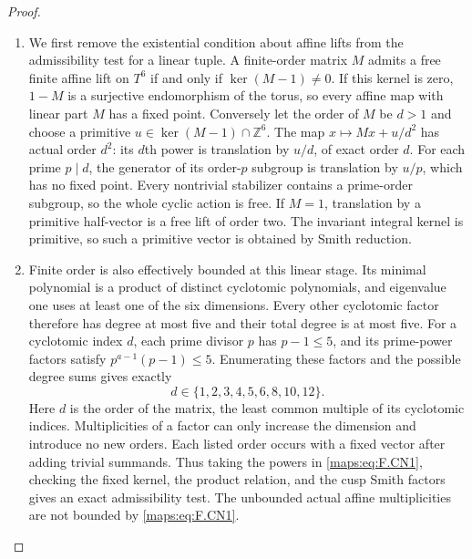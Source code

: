 \documentclass[11pt,a4paper]{article}
\theoremstyle{definition}
\begin{document}
\begin{proof}
\begin{enumerate}[label=\arabic*.]
\item We first remove the existential condition about affine lifts
from the admissibility test for a linear tuple. A finite-order
matrix $M$ admits a free finite affine lift on $T^6$ if and
only if $\ker(M-1)\ne0$. If this kernel is zero, $1-M$ is a
surjective endomorphism of the torus, so every affine map with
linear part $M$ has a fixed point. Conversely let the order of
$M$ be $d>1$ and choose a primitive $u\in\ker(M-1)\cap\mathbb Z^6$.
The map $x\mapsto Mx+u/d^2$ has actual order $d^2$: its
$d$th power is translation by $u/d$, of exact order $d$.
For each prime $p\mid d$, the generator of its order-$p$
subgroup is translation by $u/p$, which has no fixed point.
Every nontrivial stabilizer contains a prime-order subgroup,
so the whole cyclic action is free. If $M=1$, translation
by a primitive half-vector is a free lift of order two.
The invariant integral kernel is primitive, so such a
primitive vector is obtained by Smith reduction.

\item Finite order is also effectively bounded at this linear
stage. Its minimal polynomial is a product of distinct
cyclotomic polynomials, and eigenvalue one uses at least one
of the six dimensions. Every other cyclotomic factor therefore
has degree at most five and their total degree is at most
five. For a cyclotomic index $d$, each prime divisor $p$ has
$p-1\le5$, and its prime-power factors satisfy
$p^{a-1}(p-1)\le5$. Enumerating these factors and the possible
degree sums gives exactly
\[
                 d\in\{1,2,3,4,5,6,8,10,12\}.             \tag{F.CN1}\label{maps:eq:F.CN1}
\]
Here $d$ is the order of the matrix, the least common multiple
of its cyclotomic indices. Multiplicities of a factor can only
increase the dimension and introduce no new orders. Each
listed order occurs with a fixed vector after adding trivial
summands. Thus taking the powers in \eqref{maps:eq:F.CN1}, checking the
fixed kernel, the product relation, and the cusp Smith
factors gives an exact admissibility test. The unbounded
actual affine multiplicities are not bounded by \eqref{maps:eq:F.CN1}.


\end{enumerate}
\end{proof}
\end{document}
